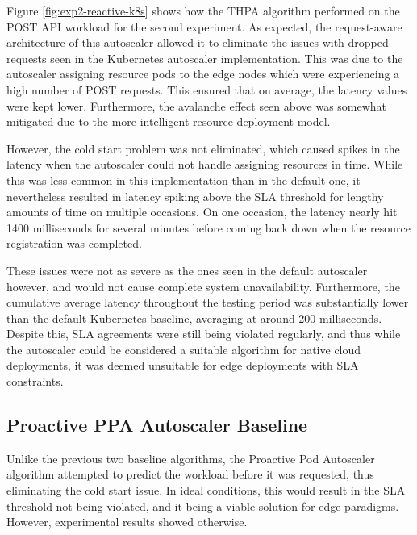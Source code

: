 Figure \ref{fig:exp2-reactive-k8s} shows how the THPA algorithm performed on the POST API workload for the second experiment. As expected, the request-aware architecture of this autoscaler allowed it to eliminate the issues with dropped requests seen in the Kubernetes autoscaler implementation. This was due to the autoscaler assigning resource pods to the edge nodes which were experiencing a high number of POST requests. This ensured that on average, the latency values were kept lower. Furthermore, the avalanche effect seen above was somewhat mitigated due to the more intelligent resource deployment model.\par

However, the cold start problem was not eliminated, which caused spikes in the latency when the autoscaler could not handle assigning resources in time. While this was less common in this implementation than in the default one, it nevertheless resulted in latency spiking above the SLA threshold for lengthy amounts of time on multiple occasions. On one occasion, the latency nearly hit 1400 milliseconds for several minutes before coming back down when the resource registration was completed.\par

These issues were not as severe as the ones seen in the default autoscaler however, and would not cause complete system unavailability. Furthermore, the cumulative average latency throughout the testing period was substantially lower than the default Kubernetes baseline, averaging at around 200 milliseconds. Despite this, SLA agreements were still being violated regularly, and thus while the autoscaler could be considered a suitable algorithm for native cloud deployments, it was deemed unsuitable for edge deployments with SLA constraints.\par

\subsection {Proactive PPA Autoscaler Baseline}
\label{subsec:ch6-proactive-algo}

Unlike the previous two baseline algorithms, the Proactive Pod Autoscaler algorithm attempted to predict the workload before it was requested, thus eliminating the cold start issue. In ideal conditions, this would result in the SLA threshold not being violated, and it being a viable solution for edge paradigms. However, experimental results showed otherwise.\par

